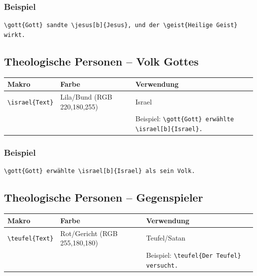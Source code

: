 \documentclass[12pt,a4paper]{scrartcl}
\begin{document}
\subsubsection{Beispiel}

\begin{lstlisting}
\gott{Gott} sandte \jesus[b]{Jesus}, und der \geist{Heilige Geist} wirkt.
\end{lstlisting}

\subsection{Theologische Personen -- Volk Gottes}

\begin{longtable}{llp{8cm}}
\toprule
\textbf{Makro} & \textbf{Farbe} & \textbf{Verwendung} \\
\midrule
\endhead
%
\lstinline|\israel{Text}| & Lila/Bund (RGB 220,180,255) & Israel \\
& & Beispiel: \lstinline|\gott{Gott} erwählte \israel[b]{Israel}.| \\
\bottomrule
\end{longtable}

\subsubsection{Beispiel}

\begin{lstlisting}
\gott{Gott} erwählte \israel[b]{Israel} als sein Volk.
\end{lstlisting}

\subsection{Theologische Personen -- Gegenspieler}

\begin{longtable}{llp{8cm}}
\toprule
\textbf{Makro} & \textbf{Farbe} & \textbf{Verwendung} \\
\midrule
\endhead
%
\lstinline|\teufel{Text}| & Rot/Gericht (RGB 255,180,180) & Teufel/Satan \\
& & Beispiel: \lstinline|\teufel{Der Teufel} versucht.| \\
\bottomrule
\end{longtable}
\end{document}
